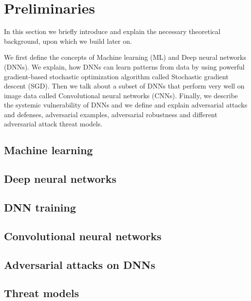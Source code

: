 \chapter{Preliminaries}

In this section we briefly introduce and explain the necessary theoretical background, upon which we build later on.

We first define the concepts of Machine learning (ML) and Deep neural networks (DNNs). We explain, how DNNs can learn patterns from data by using powerful gradient-based stochastic optimization algorithm called Stochastic gradient descent (SGD). Then we talk about a subset of DNNs that perform very well on image data called Convolutional neural networks (CNNs). Finally, we describe the systemic vulnerability of DNNs and we define and explain adversarial attacks and defenses, adversarial examples, adversarial robustness and different adversarial attack threat models. 


\section{Machine learning}
\cite{Goodfellow-et-al-2016}

\section{Deep neural networks}

\section{DNN training}

\section{Convolutional neural networks}

\section{Adversarial attacks on DNNs}

\section{Threat models}